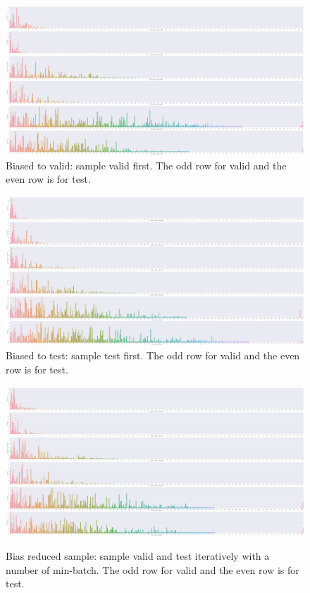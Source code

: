 \begin{figure}[!ht]
    \centering
    \includegraphics[width=\textwidth]{images/0616/C_S_V4_valid_test_ent_freq_distributions.png}
    \caption{\label{fig:biased_valid} Biased to valid: sample valid first. The odd row for valid and the even row is for test.}
\end{figure}
\begin{figure}[!ht]
    \centering
    \includegraphics[width=\textwidth]{images/0616/C_S_V5_valid_test_ent_freq_distributions.png}
    \caption{\label{fig:biased_test} Biased to test: sample test first. The odd row for valid and the even row is for test.}
\end{figure}
\begin{figure}[!ht]
    \centering
    \includegraphics[width=\textwidth]{images/0616/C_S_V6_valid_test_ent_freq_distributions.png}
    \label{fig:unbiased_valid_test_ent_freq_distributions}
    \caption{Bias reduced sample: sample valid and test iteratively with a number of min-batch. The odd row for valid and the even row is for test.}
\end{figure}
